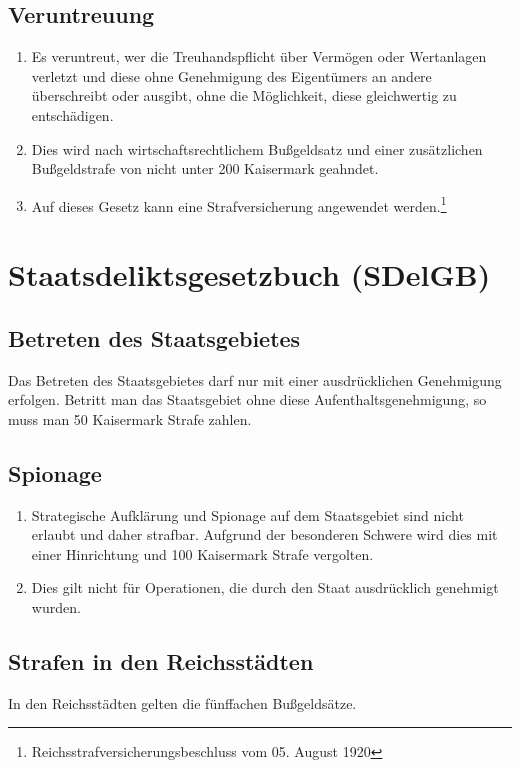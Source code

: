 \documentclass{article}
\begin{document}
\subsection{Veruntreuung}
\begin{enumerate}[(1)]
    \item Es veruntreut, wer die Treuhandspflicht über Vermögen oder Wertanlagen verletzt und diese ohne Genehmigung des Eigentümers an andere überschreibt oder ausgibt, ohne die Möglichkeit, diese gleichwertig zu entschädigen.
    \item Dies wird nach wirtschaftsrechtlichem Bußgeldsatz und einer zusätzlichen Bußgeldstrafe von nicht unter 200 Kaisermark geahndet.
    \item Auf dieses Gesetz kann eine Strafversicherung angewendet werden.\footnote{Reichsstrafversicherungsbeschluss vom 05. August 1920}
\end{enumerate}

\newpage
\section{Staatsdeliktsgesetzbuch (SDelGB)}
\localtableofcontents

\subsection{Betreten des Staatsgebietes}
Das Betreten des Staatsgebietes darf nur mit einer ausdrücklichen Genehmigung erfolgen. Betritt man das Staatsgebiet ohne diese Aufenthaltsgenehmigung, so muss man 50 Kaisermark Strafe zahlen.

\subsection{Spionage}
\begin{enumerate}[(1)]
    \item Strategische Aufklärung und Spionage auf dem Staatsgebiet sind nicht erlaubt und daher strafbar. Aufgrund der besonderen Schwere wird dies mit einer Hinrichtung und 100 Kaisermark Strafe vergolten.
    \item Dies gilt nicht für Operationen, die durch den Staat ausdrücklich genehmigt wurden. 
\end{enumerate}

\subsection{Strafen in den Reichsstädten}
In den Reichsstädten gelten die fünffachen Bußgeldsätze.
\end{document}
